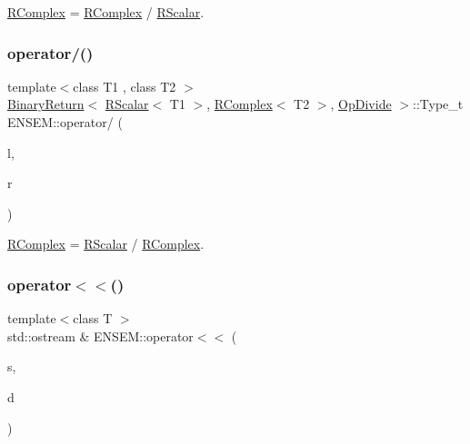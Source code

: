 \mbox{\hyperlink{classENSEM_1_1RComplex}{R\+Complex}} = \mbox{\hyperlink{classENSEM_1_1RComplex}{R\+Complex}} / \mbox{\hyperlink{classENSEM_1_1RScalar}{R\+Scalar}}. 

\mbox{\label{group__rcomplex_gacaba74ac4d092284f9b979ce552b8beb}} 
\subsubsection{\texorpdfstring{operator/()}{operator/()}\hspace{0.1cm}{\footnotesize\ttfamily [3/3]}}
{\footnotesize\ttfamily template$<$class T1 , class T2 $>$ \\
\mbox{\hyperlink{structENSEM_1_1BinaryReturn}{Binary\+Return}}$<$ \mbox{\hyperlink{classENSEM_1_1RScalar}{R\+Scalar}}$<$ T1 $>$, \mbox{\hyperlink{classENSEM_1_1RComplex}{R\+Complex}}$<$ T2 $>$, \mbox{\hyperlink{structENSEM_1_1OpDivide}{Op\+Divide}} $>$\+::Type\+\_\+t E\+N\+S\+E\+M\+::operator/ (\begin{DoxyParamCaption}\item[{const \mbox{\hyperlink{classENSEM_1_1RScalar}{R\+Scalar}}$<$ T1 $>$ \&}]{l,  }\item[{const \mbox{\hyperlink{classENSEM_1_1RComplex}{R\+Complex}}$<$ T2 $>$ \&}]{r }\end{DoxyParamCaption})\hspace{0.3cm}{\ttfamily [inline]}}



\mbox{\hyperlink{classENSEM_1_1RComplex}{R\+Complex}} = \mbox{\hyperlink{classENSEM_1_1RScalar}{R\+Scalar}} / \mbox{\hyperlink{classENSEM_1_1RComplex}{R\+Complex}}. 

\mbox{\label{group__rcomplex_ga3e9d2c0a2fe66eca65cad22143bae236}} 
\subsubsection{\texorpdfstring{operator$<$$<$()}{operator<<()}\hspace{0.1cm}{\footnotesize\ttfamily [1/3]}}
{\footnotesize\ttfamily template$<$class T $>$ \\
std\+::ostream \& E\+N\+S\+E\+M\+::operator$<$$<$ (\begin{DoxyParamCaption}\item[{std\+::ostream \&}]{s,  }\item[{const \mbox{\hyperlink{classENSEM_1_1RComplex}{R\+Complex}}$<$ T $>$ \&}]{d }\end{DoxyParamCaption})\hspace{0.3cm}{\ttfamily [inline]}}



